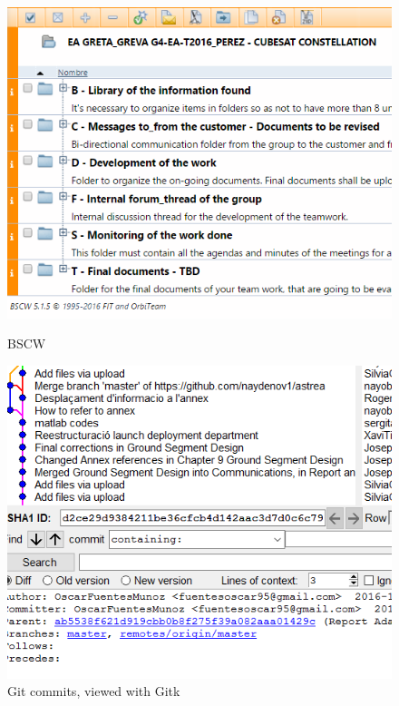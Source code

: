 \begin{figure}[H]
\includegraphics[width=\linewidth]{bscw.png}
\caption{BSCW}\label{fig:bscw}
\endminipage\hfill
{}
\includegraphics[width=\linewidth]{git.png}
\caption{Git commits, viewed with Gitk}\label{fig:git}
\endminipage
\end{figure}

